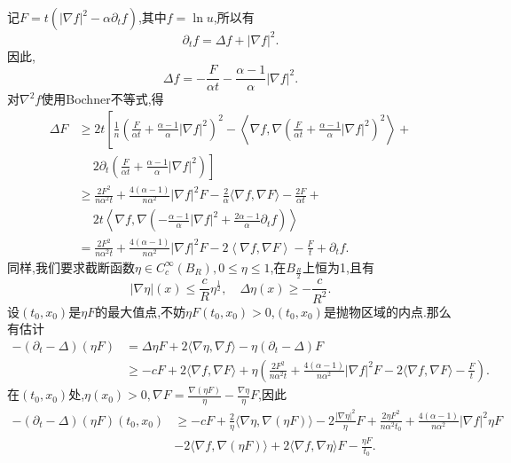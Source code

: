 \documentclass[12pt, a4paper]{ctexbook}
\begin{document}
    记$F = t(|\nabla f|^2 - \alpha \partial_t f)$,其中$f=\ln u$,所以有
    \begin{equation*}
    \partial_t f = \Delta f + |\nabla f|^2.
    \end{equation*}
    因此,
    \begin{equation*}
    \Delta f =- \frac{F}{\alpha t} - \frac{\alpha-1}{\alpha} |\nabla f|^2.
    \end{equation*}
    对$\nabla^2f$使用Bochner不等式,得
    \begin{align*}
    \Delta F &\ge 2t \left[ \frac{1}{n} \left(\frac{F}{\alpha t} + \frac{\alpha-1}{\alpha} |\nabla f|^2\right)^2 - \left\langle\nabla f,\nabla\left(\frac{F}{\alpha t} + \frac{\alpha-1}{\alpha} |\nabla f|^2\right)^2\right\rangle +\right. \\
    &\ \quad \left. 2\partial_t\left(\frac{F}{\alpha t} + \frac{\alpha-1}{\alpha} |\nabla f|^2\right) \right]\\
    &\ge \frac{2F^2}{n\alpha^2 t} + \frac{4(\alpha-1)}{n\alpha^2}|\nabla f|^2F-\frac{2}{\alpha}\langle\nabla f, \nabla F \rangle -\frac{2F}{\alpha t}+\\
    &\ \quad 2t \left\langle\nabla f,\nabla\left(-\frac{\alpha-1}{\alpha}|\nabla f|^2 + \frac{2\alpha-1}{\alpha}\partial_t f\right)\right\rangle\\
    &=\frac{2F^2}{n\alpha^2 t} +\frac{4(\alpha-1)}{n\alpha^2}|\nabla f|^2F-2\left\langle\nabla f,\nabla F\right\rangle-\frac{F}{t}+\partial_t f.
    \end{align*}
    同样,我们要求截断函数$\eta\in C^{\infty}_c(B_R),0\le \eta \le 1$,在$B_{\frac{R}{2}}$上恒为1,且有
    \begin{equation*}
    |\nabla \eta|(x) \le \frac{c}{R}\eta^{\frac12},\quad \Delta\eta(x) \ge -\frac{c}{R^2}.
    \end{equation*}
    设$(t_0,x_0)$是$\eta F$的最大值点,不妨$\eta F(t_0,x_0)>0$,$(t_0,x_0)$是抛物区域的内点.那么有估计
    \begin{align*}
    -(\partial_t-\Delta)(\eta F) &=\Delta\eta F+2\langle\nabla \eta,\nabla f\rangle-\eta(\partial_t-\Delta)F\\
    &\ge -cF +2\langle\nabla f,\nabla F\rangle+\eta\left(\frac{2F^2}{n\alpha^2 t} + \frac{4(\alpha-1)}{n\alpha^2}|\nabla f|^2 F-2\langle\nabla f,\nabla F\rangle-\frac{F}{t} \right).
    \end{align*}
    在$(t_0,x_0)$处,$\eta(x_0)>0,\nabla F = \frac{\nabla(\eta F)}{\eta}-\frac{\nabla \eta}{\eta} F $,因此
    \begin{align*}
    -(\partial_t-\Delta)(\eta F)(t_0,x_0) &\ge -cF +\frac{2}{\eta} \langle\nabla \eta,\nabla (\eta F)\rangle-2\frac{|\nabla \eta|^2}{\eta}F +\frac{2\eta F^2}{n\alpha^2t_0} + \frac{4(\alpha-1)}{n\alpha^2}|\nabla f|^2\eta F\\
    &-2\langle\nabla f,\nabla(\eta F)\rangle+2\langle\nabla f,\nabla\eta\rangle F-\frac{\eta F}{t_0}.
    \end{align*}
\end{document}
